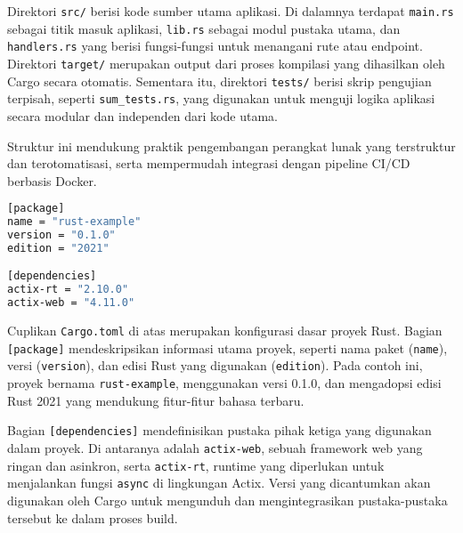 Direktori \texttt{src/} berisi kode sumber utama aplikasi. Di dalamnya terdapat \texttt{main.rs} sebagai titik masuk aplikasi, \texttt{lib.rs} sebagai modul pustaka utama, dan \texttt{handlers.rs} yang berisi fungsi-fungsi untuk menangani rute atau endpoint. Direktori \texttt{target/} merupakan output dari proses kompilasi yang dihasilkan oleh Cargo secara otomatis. Sementara itu, direktori \texttt{tests/} berisi skrip pengujian terpisah, seperti \texttt{sum\_tests.rs}, yang digunakan untuk menguji logika aplikasi secara modular dan independen dari kode utama.

Struktur ini mendukung praktik pengembangan perangkat lunak yang terstruktur dan terotomatisasi, serta mempermudah integrasi dengan pipeline CI/CD berbasis Docker.


\begin{lstlisting}[language=bash, caption={Cargo.toml}]
[package]
name = "rust-example"
version = "0.1.0"
edition = "2021"

[dependencies]
actix-rt = "2.10.0"
actix-web = "4.11.0"
\end{lstlisting}

Cuplikan \texttt{Cargo.toml} di atas merupakan konfigurasi dasar proyek Rust. Bagian \texttt{[package]} mendeskripsikan informasi utama proyek, seperti nama paket (\texttt{name}), versi (\texttt{version}), dan edisi Rust yang digunakan (\texttt{edition}). Pada contoh ini, proyek bernama \texttt{rust-example}, menggunakan versi 0.1.0, dan mengadopsi edisi Rust 2021 yang mendukung fitur-fitur bahasa terbaru.

Bagian \texttt{[dependencies]} mendefinisikan pustaka pihak ketiga yang digunakan dalam proyek. Di antaranya adalah \texttt{actix-web}, sebuah framework web yang ringan dan asinkron, serta \texttt{actix-rt}, runtime yang diperlukan untuk menjalankan fungsi \texttt{async} di lingkungan Actix. Versi yang dicantumkan akan digunakan oleh Cargo untuk mengunduh dan mengintegrasikan pustaka-pustaka tersebut ke dalam proses build.


